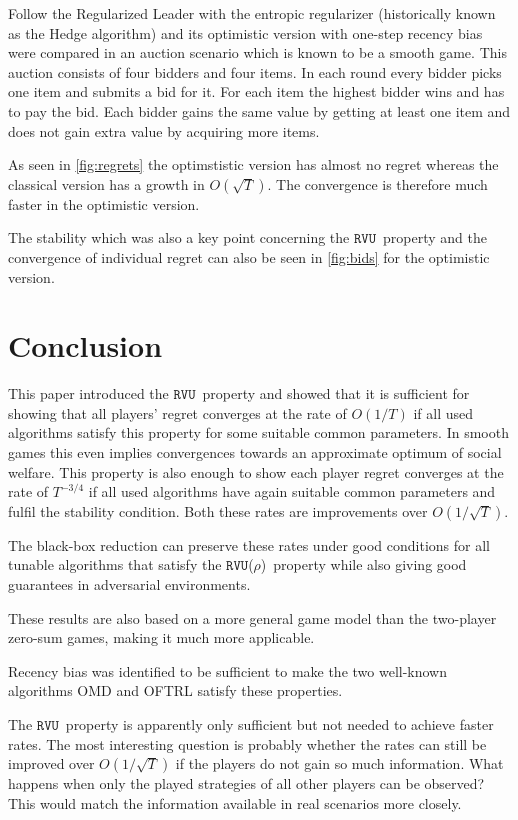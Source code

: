 \documentclass[a4paper]{article}
\theoremstyle{definition}
\newcommand{\myprop}{\ensuremath{\texttt{RVU}}}
\newcommand{\knob}{\ensuremath{\rho}}
\begin{document}
Follow the Regularized Leader with the entropic regularizer
(historically known as the Hedge algorithm) and its optimistic version
with one-step recency bias were compared in an auction scenario which is
known to be a smooth game.
This auction consists of four bidders and four items.
In each round every bidder picks one item and submits a bid for it.
For each item the highest bidder wins and has to pay the bid.
Each bidder gains the same value by getting at least one item and does
not gain extra value by acquiring more items.

As seen in \autoref{fig:regrets} the optimstistic version has almost no regret
whereas the classical version has a growth in $O(\sqrt{T})$.
The convergence is therefore much faster in the optimistic version.

The stability which was also a key point concerning the
\myprop~property and the convergence of individual regret can also be
seen in \autoref{fig:bids} for the optimistic version.



\section{Conclusion}

This paper introduced the \myprop~property and showed that it is
sufficient for showing that all players' regret converges at the rate of
$O(1/T)$ if all used algorithms satisfy this property for some suitable common
parameters.
In smooth games this even implies convergences towards an approximate
optimum of social welfare.
This property is also enough to show each player regret converges at
the rate of $T^{-3/4}$ if all used algorithms have again suitable
common parameters and fulfil the stability condition.
Both these rates are improvements over $O(1/\sqrt{T})$.

The black-box reduction can preserve these rates under good conditions
for all tunable algorithms that satisfy the \myprop(\knob)~property
while also giving good guarantees in adversarial environments.

These results are also based on a more general game model than the
two-player zero-sum games, making it much more applicable.

Recency bias was identified to be sufficient to make the two
well-known algorithms OMD and OFTRL satisfy these properties.

The \myprop~property is apparently only sufficient but not needed to
achieve faster rates.
The most interesting question is probably whether the rates can still
be improved over $O(1/\sqrt{T})$ if the players do not gain so much
information.
What happens when only the played strategies of all other players can
be observed? This would match the information available in real scenarios more closely.
\end{document}
